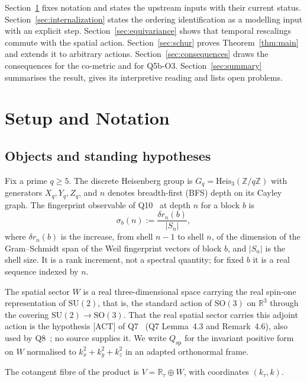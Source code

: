 \documentclass[12pt,a4paper]{article}
\newcommand{\Heis}{\mathrm{Heis}}
\newcommand{\SU}{\mathrm{SU}}
\newcommand{\Qsp}{Q_{\mathrm{sp}}}
\newcommand{\Rtau}{\mathbb{R}_\tau}
\begin{document}
      Section~\ref{sec:setup} fixes notation and states the upstream inputs with their current status.
      Section~\ref{sec:internalization} states the ordering identification as a modelling input with an explicit step.
      Section~\ref{sec:equivariance} shows that temporal rescalings commute with the spatial action.
      Section~\ref{sec:schur} proves Theorem~\ref{thm:main} and extends it to arbitrary actions.
      Section~\ref{sec:consequences} draws the consequences for the co-metric and for Q5b-O3.
      Section~\ref{sec:summary} summarises the result, gives its interpretive reading and lists open problems.

      \newpage
  \section{Setup and Notation}
    \label{sec:setup}

    \subsection{Objects and standing hypotheses}

      Fix a prime $q\geq 5$.
      The discrete Heisenberg group is $G_q = \Heis_3(\mathbb{Z}/q\mathbb{Z})$ with generators $X_q,Y_q,Z_q$, and
      $n$ denotes breadth-first (BFS) depth on its Cayley graph.
      The fingerprint observable of Q10~\cite{Beau2026q10} at depth $n$ for a block $b$ is
      \[
        \sigma_b(n) := \frac{\delta r_n(b)}{|S_n|},
      \]
      where $\delta r_n(b)$ is the increase, from shell $n-1$ to shell $n$, of the dimension of the Gram--Schmidt span
      of the Weil fingerprint vectors of block $b$, and $|S_n|$ is the shell size.
      It is a rank increment, not a spectral quantity; for fixed $b$ it is a real sequence indexed by $n$.

      The spatial sector $W$ is a real three-dimensional space carrying the real spin-one representation of $\SU(2)$,
      that is, the standard action of $\mathrm{SO}(3)$ on $\mathbb{R}^3$ through the covering
      $\SU(2)\to\mathrm{SO}(3)$.
      That the real spatial sector carries this adjoint action is the hypothesis [ACT] of Q7~\cite{Beau2026q7}
      (Q7 Lemma~4.3 and Remark~4.6), also used by Q8~\cite{BeauQ8}; no source supplies it.
      We write $\Qsp$ for the invariant positive form on $W$ normalised to $k_x^2 + k_y^2 + k_z^2$ in an adapted
      orthonormal frame.

      The cotangent fibre of the product is $V = \Rtau\oplus W$, with coordinates $(k_\tau, k)$.
\end{document}
